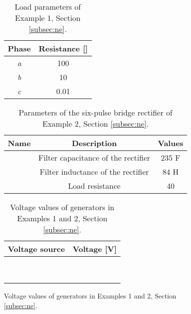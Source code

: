 \documentclass[a4paper]{article}
\theoremstyle{plain}
\begin{document}
\begin{figure}[htb]
\begin{circuitikz}[scale=.91,transform shape, color=black]
	\begin{table}[!h]
			\centering
			\begin{tabular}{cc}
				\toprule
                          Phase & Resistance [] \\
				\midrule
				\textit{a} & 100 \\
				\textit{b} & 10 \\
				\textit{c} & 0.01 \\
				\bottomrule
			\end{tabular}
			\caption{Load parameters of Example 1, Section \ref{subsec:ne}.}
			\label{Appendix:3FTable:Loads}
		\end{table}

	\begin{table}
			\centering
			\begin{tabular}{ccc}
				\toprule
				Name & Description & Values \\ \midrule
				 & Filter capacitance of the rectifier & 235 F\\
				 & Filter inductance of the rectifier & 84 H \\
				 & Load resistance					& 	40 \\
				\bottomrule
			\end{tabular}
			\caption{Parameters of the six-pulse bridge
                          rectifier of Example 2, Section \ref{subsec:ne}.}
			\label{Appendix:TableNonlinearload}
		\end{table}
		
	\begin{table}
		\centering
		\renewcommand{\arraystretch}{2.0}
		\begin{tabular}{cc}
			\toprule
			Voltage source & Voltage [V] \\ \midrule
			 &  \\
			 & \\
			 & \\
			 & \\
			 & \\
			 & \\
			 & \\
			 & \\
			 & \\
			\bottomrule
		\end{tabular}
		\caption{Voltage values of generators in Examples 1 and 2, Section \ref{subsec:ne}.}
		\label{Appendix:TableVoltages}
	\end{table}      \clearpage

\end{circuitikz}
\end{figure}
\end{document}
